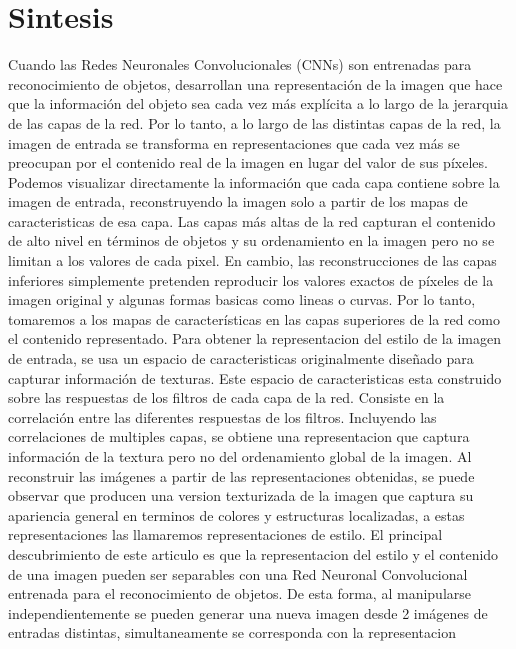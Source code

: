 \documentclass[a4paper,11pt,spanish]{book}
\begin{document}
    \section{Sintesis \label{sec:sintesis}}
      Cuando las Redes Neuronales Convolucionales (CNNs) son entrenadas para reconocimiento de objetos, desarrollan una representación de la imagen que hace que la información
      del objeto sea cada vez más explícita a lo largo de la jerarquia de las capas de la red. Por lo tanto, a lo largo de las distintas capas de la red,
      la imagen de entrada se transforma en representaciones que cada vez más se preocupan por el contenido real de la imagen en lugar del valor de sus píxeles.
      Podemos visualizar directamente la información que cada capa contiene sobre la imagen de entrada, reconstruyendo la imagen solo a partir de los mapas de caracteristicas
      de esa capa. Las capas más altas de la red capturan el contenido de alto nivel en términos de objetos y su ordenamiento en la imagen pero no se limitan a los valores de cada
      pixel. En  cambio, las reconstrucciones de las capas inferiores simplemente pretenden reproducir los valores exactos de píxeles de la imagen original y algunas formas
      basicas como lineas o curvas. Por lo tanto, tomaremos a los mapas de características en las capas superiores de la red como el contenido representado.
      Para obtener la representacion del estilo de la imagen de entrada, se usa un espacio de caracteristicas originalmente diseñado para capturar información de texturas.
      Este espacio de caracteristicas esta construido sobre las respuestas de los filtros de cada capa de la red. Consiste en la correlación entre las diferentes respuestas de los filtros.
      Incluyendo las correlaciones de multiples capas, se obtiene una representacion que captura información de la textura pero no del ordenamiento global de la imagen.
      Al reconstruir las imágenes a partir de las representaciones obtenidas, se puede observar que producen una version texturizada de la imagen que captura su
      apariencia general en terminos de colores y estructuras localizadas, a estas representaciones las llamaremos representaciones de estilo.
      El principal descubrimiento de este articulo es que la representacion del estilo y el contenido de una imagen pueden ser separables con una Red Neuronal Convolucional entrenada
      para el reconocimiento de objetos. De esta forma, al manipularse independientemente se pueden generar una nueva imagen desde 2 imágenes de entradas distintas, simultaneamente se corresponda con la representacion
\end{document}
